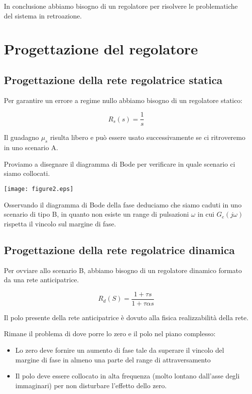 \documentclass{article}
\begin{document}
In conclusione abbiamo bisogno di un regolatore per risolvere le problematiche del sistema in retroazione.

\section{Progettazione del regolatore}

\subsection{Progettazione della rete regolatrice statica}

Per garantire un errore a regime nullo abbiamo bisogno di un regolatore statico:

$$
R_s(s)=\frac{1}{s}
$$

Il guadagno $\mu_s$ risulta libero e può essere usato successivamente se ci ritroveremo in uno scenario A.

Proviamo a disegnare il diagramma di Bode per verificare in quale scenario ci siamo collocati.

\begin{center}
    \texttt{[image: figure2.eps]}
\end{center}

Osservando il diagramma di Bode della fase deduciamo che siamo caduti in uno scenario di tipo B, in quanto non esiste un range di pulsazioni $\omega$ in cui $G_e(j\omega)$ rispetta il vincolo sul margine di fase.

\subsection{Progettazione della rete regolatrice dinamica}

Per ovviare allo scenario B, abbiamo bisogno di un regolatore dinamico formato da una rete anticipatrice.

$$
R_d(S)=\frac{1+\tau s}{1+\tau \alpha s}
$$

Il polo presente della rete anticipatrice è dovuto alla fisica realizzabilità della rete.

Rimane il problema di dove porre lo zero e il polo nel piano complesso:
\begin{itemize}
    \item Lo zero deve fornire un aumento di fase tale da superare il vincolo del margine di fase in almeno una parte del range di attraversamento
    \item Il polo deve essere collocato in alta frequenza (molto lontano dall'asse degli immaginari) per non disturbare l'effetto dello zero.
\end{itemize}
\end{document}
